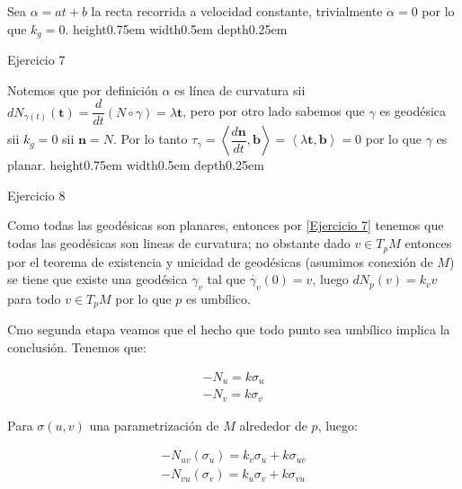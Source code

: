 \documentclass[11pt]{article}
\newcommand\ip[1]{\left\langle#1\right\rangle}
\renewcommand\tt{\mathbf{t}}
\newcommand\nn{\mathbf{n}}
\newcommand\bb{\mathbf{b}}                      %
\newenvironment{proof}[1][Demostraci\'on]{\begin{trivlist}
		\item[\hskip \labelsep {\bfseries #1}]}{\end{trivlist}}
\newcommand{\qed}{\nobreak \ifvmode \relax \else
	\ifdim\lastskip<1.5em \hskip-\lastskip
	\hskip1.5em plus0em minus0.5em \fi \nobreak
	\vrule height0.75em width0.5em depth0.25em\fi}
\begin{document}
\begin{enumerate}
	\label{Ejercicio 6}
	
	\begin{proof}
		
		Sea $\alpha = at +b$ la recta recorrida a velocidad constante, trivialmente $\ddot{\alpha} = 0$ por lo que $k_g = 0$. \qed
		
	\end{proof}
	
	\item Ejercicio 7
	
	
	\label{Ejercicio 7}
	
	\begin{proof}
		
		Notemos que por definici\'on $\alpha$ es l\'inea de curvatura sii $dN_{\gamma(t)}(\tt) = \dfrac{d}{dt} \left(N \circ \gamma\right) = \lambda \tt$, pero por otro lado sabemos que $\gamma$ es geod\'esica sii $k_g = 0$ sii $\nn = N$. Por lo tanto $\tau_{\gamma} = \ip{\dfrac{d \nn}{dt} , \bb} = \ip{\lambda \tt , \bb} = 0$ por lo que $\gamma$ es planar. \qed
		
	\end{proof}
	
	\item Ejercicio 8
	
	\label{Ejercicio 8}
	
	\begin{proof}
		
		Como todas las geod\'esicas son planares, entonces por \ref{Ejercicio 7} tenemos que todas las geod\'esicas son lineas de curvatura; no obstante dado $v \in T_pM$ entonces por el teorema de existencia y unicidad de geod\'esicas (asumimos conexi\'on de $M$) se tiene que existe una geod\'esica $\gamma_v$ tal que $\dot{\gamma_v}(0) = v$, luego $dN_p(v) = k_vv$ para todo $v \in T_pM$ por lo que $p$ es umb\'ilico.
		
		Cmo segunda etapa veamos que el hecho que todo punto sea umb\'ilico implica la conclusi\'on. Tenemos que:
		
		
		\[
		\begin{aligned}
		-N_u = k \sigma_u \\
		-N_v = k \sigma_v
		\end{aligned} 
		\]		
		
		Para $\sigma(u,v)$ una parametrizaci\'on de $M$ alrededor de $p$, luego:
		
		
		\[
		\begin{aligned}
		-N_{uv}(\sigma_u) = k_v \sigma_u + k \sigma_{uv}\\
		-N_{vu}(\sigma_v) = k_u \sigma_v + k \sigma_{vu}
		\end{aligned} 
		\]		
		

\end{proof}
\end{enumerate}
\end{document}
